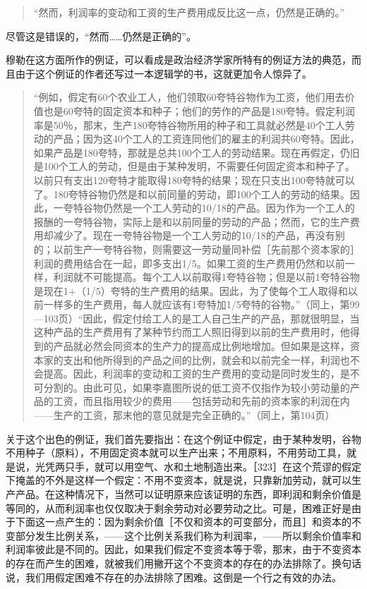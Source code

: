 \begin{quote}{“然而，利润率的变动和工资的生产费用成反比这一点，仍然是正确的。”}\end{quote}

尽管这是错误的，“然而……仍然是正确的”。

穆勒在这方面所作的例证，可以看成是政治经济学家所特有的例证方法的典范，而且由于这个例证的作者还写过一本逻辑学的书，这就更加令人惊异了。

\begin{quote}{“例如，假定有60个农业工人，他们领取60夸特谷物作为工资，他们用去价值也是60夸特的固定资本和种子；他们的劳作的产品是180夸特。假定利润率是50％，那末，生产180夸特谷物所用的种子和工具就必然是40个工人劳动的产品；因为这40个工人的工资连同他们的雇主的利润共60夸特。因此，如果产品是180夸特，那就是总共100个工人的劳动结果。现在再假定，仍旧是100个工人的劳动，但是由于某种发明，不需要任何固定资本和种子了。以前只有支出120夸特才能取得180夸特的结果；现在只支出100夸特就可以了。180夸特谷物仍然是和以前同量的劳动，即100个工人的劳动的结果。因此，一夸特谷物仍然是一个工人劳动的10/18的产品。因为作为一个工人的报酬的一夸特谷物，实际上是和以前同量的劳动的产品；然而，它的生产费用却减少了。现在一夸特谷物是一个工人劳动的10/18的产品，再没有别的；以前生产一夸特谷物，则需要这一劳动量同补偿［先前那个资本家的］利润的费用结合在一起，即多支出1/5。如果工资的生产费用仍然和以前一样，利润就不可能提高。每个工人以前取得1夸特谷物；但是以前1夸特谷物是现在1+（1/5）夸特的生产费用的结果。因此，为了使每个工人取得和以前一样多的生产费用，每人就应该有1夸特加1/5夸特的谷物。”（同上，第99—103页）“因此，假定付给工人的是工人自己生产的产品，那就很明显，当这种产品的生产费用有了某种节约而工人照旧得到以前的生产费用时，他得到的产品就必然会同资本的生产力的提高成比例地增加。但如果是这样，资本家的支出和他所得到的产品之间的比例，就会和以前完全一样，利润也不会提高。因此，利润率的变动和工资的生产费用的变动是同时发生的，是不可分割的。由此可见，如果李嘉图所说的低工资不仅指作为较小劳动量的产品的工资，而且指用较少的费用——包括劳动和先前的资本家的利润在内——生产的工资，那末他的意见就是完全正确的。”（同上，第104页）}\end{quote}

关于这个出色的例证，我们首先要指出：在这个例证中假定，由于某种发明，谷物不用种子（原料），不用固定资本就可以生产出来；不用原料，不用劳动工具，就是说，光凭两只手，就可以用空气、水和土地制造出来。［323］在这个荒谬的假定下掩盖的不外是这样一个假定：不用不变资本，就是说，只靠新加劳动，就可以生产产品。在这种情况下，当然可以证明原来应该证明的东西，即利润和剩余价值是等同的，从而利润率也仅仅取决于剩余劳动对必要劳动之比。可是，困难正好是由于下面这一点产生的：因为剩余价值［不仅和资本的可变部分，而且］和资本的不变部分发生比例关系，——这个比例关系我们称为利润率，——所以剩余价值率和利润率彼此是不同的。因此，如果我们假定不变资本等于零，那末，由于不变资本的存在而产生的困难，就被我们用撇开这个不变资本的存在的办法排除了。换句话说，我们用假定困难不存在的办法排除了困难。这倒是一个行之有效的办法。

